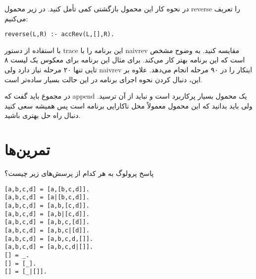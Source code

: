در نحوه کار این محمول بازگشتی کمی تأمل کنید. در زیر محمول reverse را تعریف می‌کنیم:
\begin{latin}
\begin{lstlisting}
reverse(L,R) :- accRev(L,[],R).
\end{lstlisting}
\end{latin}

با استفاده از دستور trace این برنامه را با naivrev مقایسه کنید. به وضوح مشخص است که این برنامه بهتر کار می‌کند. برای مثال این برنامه برای معکوس یک لیست ۸ تایی تنها ۲۰ مرحله نیاز دارد ولی naivrev اینکار را در ۹۰ مرحله انجام می‌دهد. علاوه بر این، دنبال کردن نحوه اجرای برنامه در این حالت بسیار ساده‌تر است.

در مجموع باید گفت که append یک محمول بسیار پرکاربرد است و نباید از آن ترسید. ولی باید بدانید که این محمول معمولاً محل ناکارایی برنامه است پس همیشه سعی کنید دنبال راه حل بهتری باشید.

\clearpage

\section{تمرین‌ها}

\begin{exercise}
پاسخ پرولوگ به هر کدام از پرسش‌های زیر چیست؟

\begin{latin}
\begin{lstlisting}
[a,b,c,d] = [a,[b,c,d]].
[a,b,c,d] = [a|[b,c,d]].
[a,b,c,d] = [a,b,[c,d]].
[a,b,c,d] = [a,b|[c,d]].
[a,b,c,d] = [a,b,c,[d]].
[a,b,c,d] = [a,b,c|[d]].
[a,b,c,d] = [a,b,c,d,[]].
[a,b,c,d] = [a,b,c,d|[]].
[] = _.
[] = [_].
[] = [_|[]].
\end{lstlisting}
\end{latin}

\end{exercise}

